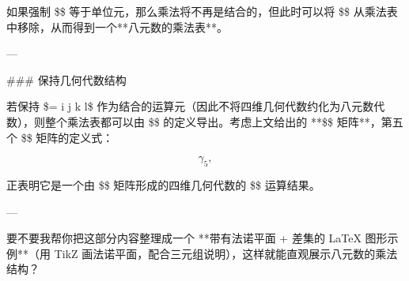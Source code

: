 如果强制 \$\star\$ 等于单位元，那么乘法将不再是结合的，但此时可以将 \$\star\$ 从乘法表中移除，从而得到一个**八元数的乘法表**。

---

### 保持几何代数结构

若保持 \$\star = i j k l\$ 作为结合的运算元（因此不将四维几何代数约化为八元数代数），则整个乘法表都可以由 \$\star\$ 的定义导出。考虑上文给出的 **\$\gamma\$ 矩阵**，第五个 \$\gamma\$ 矩阵的定义式：

$$
\gamma_{5},
$$

正表明它是一个由 \$\gamma\$ 矩阵形成的四维几何代数的 \$\star\$ 运算结果。

---

要不要我帮你把这部分内容整理成一个 **带有法诺平面 + 差集的 LaTeX 图形示例**（用 TikZ 画法诺平面，配合三元组说明），这样就能直观展示八元数的乘法结构？
